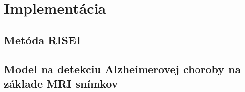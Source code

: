 \chapter{Implementácia}

\section{Metóda RISEI}

\section{Model na detekciu Alzheimerovej choroby na základe MRI snímkov}
